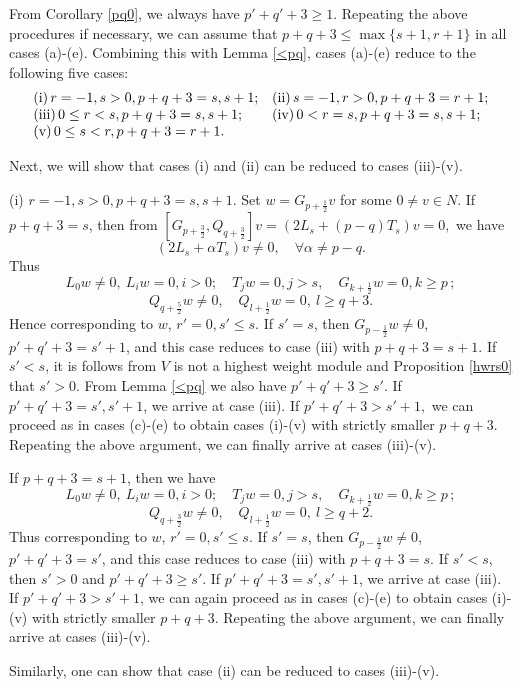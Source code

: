 \documentclass[12pt]{article}
\def\a{\alpha}
\numberwithin{equation}{section}
\begin{document}
From Corollary \ref{pq0}, we always have $p'+q'+3\ge 1$.  Repeating the above procedures if necessary, we can assume that $p+q+3\le \max\{s+1,r+1\}$ in all cases (a)-(e).
Combining this with  Lemma \ref{<pq},  cases (a)-(e)  reduce to the following five cases:
$$\begin{array}{ll} {\rm (i)}\,  r=-1, s>0, p+q+3=s, s+1;& {\rm (ii)}\,  s=-1,r>0, p+q+3=r+1; \\
{\rm (iii)}\,  0\le r<s, p+q+3=s,s+1; & {\rm (iv)}\, 0<r=s, p+q+3=s,s+1; \\
{\rm  (v)} \, 0\le s<r, p+q+3=r+1.&
\end{array}
$$

Next, we will show that cases (i) and (ii) can be reduced to cases (iii)-(v).

(i) $r=-1, s>0, p+q+3=s, s+1$.   Set $w=G_{p+\frac{1}{2}}v$ for some $0\ne v\in N$.  If $p+q+3=s$, then  from
$[G_{p+\frac{3}{2}},Q_{q+\frac{3}{2}}]v=(2L_s+(p-q)T_s)v=0,$
we have
\begin{equation}\label{a=p-q}
(2L_s+\a T_s)v\ne 0,\quad \forall \a\ne p-q.
\end{equation}
Thus
$$ L_0w\ne 0,\ L_iw=0,i>0; \quad T_jw=0, j>s,\quad G_{k+\frac{1}{2}}w=0,k\ge p\,; $$
$$ Q_{q+\frac{5}{2}}w\ne 0, \quad  Q_{l+\frac{1}{2}}w= 0,\ l\ge q+3.$$  Hence corresponding to $w$, $r'=0, s'\le s.$
If $s'=s$, then $G_{p-\frac{1}{2}}w\ne 0$, $p'+q'+3=s'+1$, and  this case  reduces to  case (iii) with $p+q+3=s+1.$  If $s'<s$, it is follows from   $V$ is not a highest weight module and Proposition \ref{hwrs0} that $s'>0$. From Lemma \ref{<pq} we also have $p'+q'+3\ge s'$. If  $p'+q'+3=s',s'+1$,  we arrive at case (iii). If $p'+q'+3>s'+1,$ we can proceed as in cases (c)-(e) to obtain cases (i)-(v) with strictly smaller $p+q+3$. Repeating the above argument, we can finally arrive at  cases (iii)-(v).


If  $p+q+3=s+1$, then we have
$$ L_0w\ne 0,\ L_iw=0,i>0; \quad T_jw=0, j>s,\quad G_{k+\frac{1}{2}}w=0,k\ge p\,; $$
$$ Q_{q+\frac{3}{2}}w\ne 0, \quad  Q_{l+\frac{1}{2}}w= 0,\ l\ge q+2.$$  Thus corresponding to $w$, $r'=0, s'\le s.$
If $s'=s$, then $G_{p-\frac{1}{2}}w\ne 0$, $p'+q'+3=s'$, and  this case reduces to  case (iii) with $p+q+3=s.$  If $s'<s$, then $s'>0$ and $p'+q'+3\ge s'$. If  $p'+q'+3=s',s'+1$,  we arrive at case (iii).
If $p'+q'+3>s'+1$, we can again proceed as in cases (c)-(e) to obtain cases (i)-(v) with strictly smaller $p+q+3$. Repeating the above argument, we can finally arrive at  cases (iii)-(v).


Similarly, one can show that case (ii)  can be reduced to cases (iii)-(v).
\end{document}
